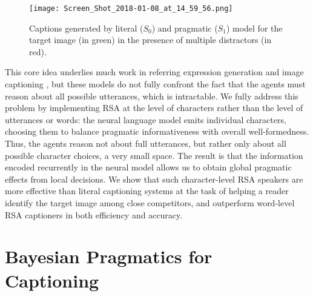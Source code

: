 \documentclass[11pt,a4paper]{article}
\begin{document}
\begin{figure}
\texttt{[image: Screen\_Shot\_2018-01-08\_at\_14\_59\_56.png]}
\caption{Captions generated by literal ($S_0$) and pragmatic ($S_1$) model for the target image (in green) in the presence of multiple distractors (in red).}
\label{fig1}
\end{figure}

This core idea underlies much work in referring expression generation
\cite{Dale:Reiter:1995,Monroe:Potts:2015,andreas2016reasoning,monroe2016learning}
and image captioning \cite{mao2016generation,murphy}, but these
models do not fully confront the fact that the agents must reason
about all possible utterances, which is intractable. We fully address
this problem by implementing RSA at the level of characters rather
than the level of utterances or words: the neural language model emits individual characters,
choosing them to balance pragmatic informativeness with overall
well-formedness. Thus, the agents reason not about full utterances, but rather only about all possible character choices, a very small space. The result is that the information encoded recurrently in the neural model allows us to obtain global pragmatic effects from local  decisions. We show that such character-level RSA speakers are more effective than literal captioning systems at the task of helping a reader identify the target image among close competitors, and outperform word-level RSA captioners in both efficiency and accuracy.

\section{Bayesian Pragmatics for Captioning} \label{rsaintro}
\end{document}
